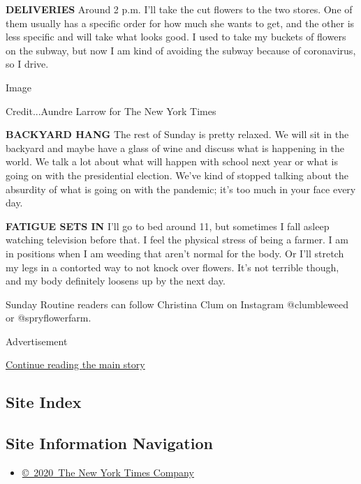 \textbf{DELIVERIES} Around 2 p.m. I'll take the cut flowers to the two
stores. One of them usually has a specific order for how much she wants
to get, and the other is less specific and will take what looks good. I
used to take my buckets of flowers on the subway, but now I am kind of
avoiding the subway because of coronavirus, so I drive.

Image

Credit...Aundre Larrow for The New York Times

\textbf{BACKYARD HANG} The rest of Sunday is pretty relaxed. We will sit
in the backyard and maybe have a glass of wine and discuss what is
happening in the world. We talk a lot about what will happen with school
next year or what is going on with the presidential election. We've kind
of stopped talking about the absurdity of what is going on with the
pandemic; it's too much in your face every day.

\textbf{FATIGUE SETS IN} I'll go to bed around 11, but sometimes I fall
asleep watching television before that. I feel the physical stress of
being a farmer. I am in positions when I am weeding that aren't normal
for the body. Or I'll stretch my legs in a contorted way to not knock
over flowers. It's not terrible though, and my body definitely loosens
up by the next day.

Sunday Routine readers can follow Christina Clum on Instagram
@clumbleweed or @spryflowerfarm.

Advertisement

\protect\hyperlink{after-bottom}{Continue reading the main story}

\hypertarget{site-index}{%
\subsection{Site Index}\label{site-index}}

\hypertarget{site-information-navigation}{%
\subsection{Site Information
Navigation}\label{site-information-navigation}}

\begin{itemize}
\tightlist
\item
  \href{https://help.nytimes3xbfgragh.onion/hc/en-us/articles/115014792127-Copyright-notice}{©~2020~The
  New York Times Company}
\end{itemize}


